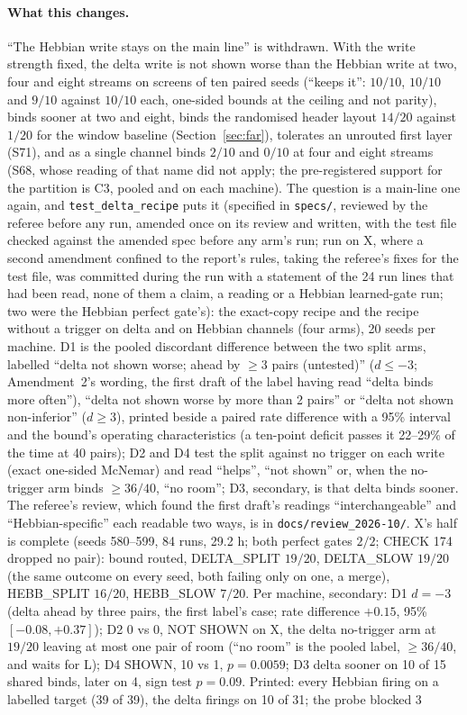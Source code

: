 \documentclass[11pt]{article}
\begin{document}
\paragraph{What this changes.} ``The Hebbian write stays on the main line'' is withdrawn. With the write strength fixed, the delta write is not shown worse than the Hebbian write at two, four and eight streams on screens of ten paired seeds (``keeps it'': $10/10$, $10/10$ and $9/10$ against $10/10$ each, one-sided bounds at the ceiling and not parity), binds sooner at two and eight, binds the randomised header layout $14/20$ against $1/20$ for the window baseline (Section~\ref{sec:far}), tolerates an unrouted first layer (S71), and as a single channel binds $2/10$ and $0/10$ at four and eight streams (S68, whose reading of that name did not apply; the pre-registered support for the partition is C3, pooled and on each machine). The question is a main-line one again, and \texttt{test\_delta\_recipe} puts it (specified in \texttt{specs/}, reviewed by the referee before any run, amended once on its review and written, with the test file checked against the amended spec before any arm's run; run on X, where a second amendment confined to the report's rules, taking the referee's fixes for the test file, was committed during the run with a statement of the 24 run lines that had been read, none of them a claim, a reading or a Hebbian learned-gate run; two were the Hebbian perfect gate's): the exact-copy recipe and the recipe without a trigger on delta and on Hebbian channels (four arms), 20 seeds per machine. D1 is the pooled discordant difference between the two split arms, labelled ``delta not shown worse; ahead by $\geq 3$ pairs (untested)'' ($d \leq -3$; Amendment~2's wording, the first draft of the label having read ``delta binds more often''), ``delta not shown worse by more than 2 pairs'' or ``delta not shown non-inferior'' ($d \geq 3$), printed beside a paired rate difference with a 95\% interval and the bound's operating characteristics (a ten-point deficit passes it 22--29\% of the time at 40 pairs); D2 and D4 test the split against no trigger on each write (exact one-sided McNemar) and read ``helps'', ``not shown'' or, when the no-trigger arm binds $\geq 36/40$, ``no room''; D3, secondary, is that delta binds sooner. The referee's review, which found the first draft's readings ``interchangeable'' and ``Hebbian-specific'' each readable two ways, is in \texttt{docs/review\_2026-10/}. X's half is complete (seeds 580--599, 84 runs, 29.2 h; both perfect gates $2/2$; CHECK 174 dropped no pair): bound routed, DELTA\_SPLIT $19/20$, DELTA\_SLOW $19/20$ (the same outcome on every seed, both failing only on one, a merge), HEBB\_SPLIT $16/20$, HEBB\_SLOW $7/20$. Per machine, secondary: D1 $d = -3$ (delta ahead by three pairs, the first label's case; rate difference $+0.15$, 95\% $[-0.08, +0.37]$); D2 0 vs 0, NOT SHOWN on X, the delta no-trigger arm at $19/20$ leaving at most one pair of room (``no room'' is the pooled label, $\geq 36/40$, and waits for L); D4 SHOWN, 10 vs 1, $p = 0.0059$; D3 delta sooner on 10 of 15 shared binds, later on 4, sign test $p = 0.09$. Printed: every Hebbian firing on a labelled target (39 of 39), the delta firings on 10 of 31; the probe blocked 3 
\end{document}
